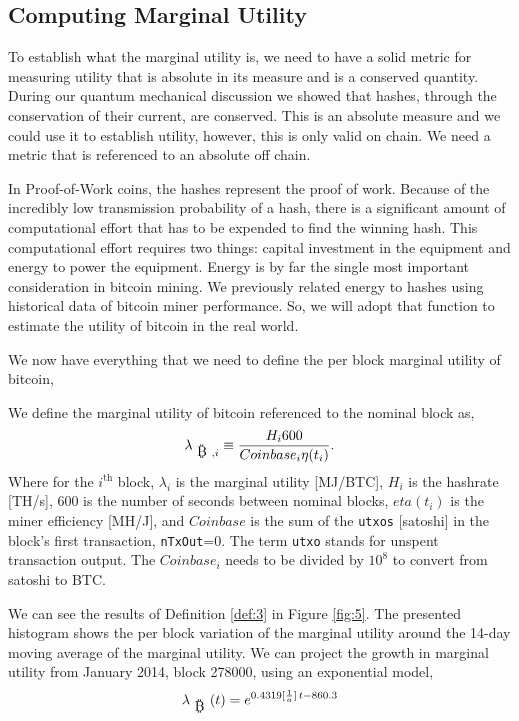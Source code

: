 \documentclass[runningheads]{llncs}
\def\bitcoin{
    \leavevmode
    \vtop{\offinterlineskip %
    \setbox0=\hbox{B}
    \setbox2=\hbox to\wd0{\hfil\hskip-.03em
    \vrule height .3ex width .15ex\hskip .08em
    \vrule height .3ex width .15ex\hfil}
    \vbox{\copy2\box0}\box2}
}
\begin{document}
\subsection{Computing Marginal Utility}\label{sect:3.2}
To establish what the marginal utility is, we need to have a solid metric for measuring utility that is absolute in its measure and is a conserved quantity.
During our quantum mechanical discussion we showed that  hashes, through the conservation of their current, are conserved.
This is an absolute measure and we could use it to establish utility, however, this is only valid on chain.
We need a metric that is referenced to an absolute off chain.

In Proof-of-Work coins, the hashes represent the proof of work.
Because of the incredibly low transmission probability of a hash, there is a significant amount of computational effort that has to be expended to find the winning hash.
This computational effort requires two things: capital investment in the equipment and energy to power the equipment.
Energy is by far the single most important consideration in bitcoin mining.
We previously related energy to hashes using historical data of bitcoin miner performance.
So, we will adopt that function to estimate the utility of bitcoin in the real world.

We now have everything that we need to define the per block marginal utility of bitcoin,
\begin{definition}\label{def:3}
    We define the marginal utility of bitcoin referenced to the nominal block as,
    \begin{equation}
        \lambda_{\mbox{\bitcoin},i} \equiv \frac{H_i 600}{Coinbase_i \eta(t_i)}.\label{eq:9}
    \end{equation}
    Where for the $i^{\mbox{th}}$ block, $\lambda_i$ is the marginal utility [MJ/BTC], $H_i$ is the hashrate [TH/s], 600 is the number of seconds between nominal blocks, $eta(t_i)$ is the miner efficiency [MH/J], and $Coinbase$ is the sum of the {\tt utxos} [satoshi] in the block's first transaction, {\tt nTxOut}=0.
    The term {\tt utxo} stands for unspent transaction output. The $Coinbase_i$ needs to be divided by $10^8$ to convert from satoshi to BTC.
\end{definition}

We can see the results of Definition \ref{def:3} in Figure \ref{fig:5}.
The presented histogram shows the per block variation of the marginal utility around the 14-day moving average of the marginal utility.
We can project the growth in marginal utility from January 2014, block 278000, using an exponential model,
\begin{equation}
    \lambda_{\mbox{\bitcoin}}(t) = e^{0.4319[\frac{1}{a}] \, t - 860.3}\label{eq:15}
\end{equation}
\end{document}
